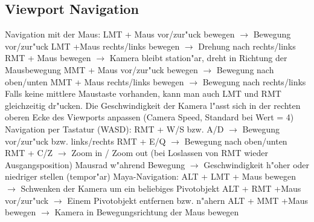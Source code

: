 \documentclass[11pt, titlepage]{article}
\begin{document}
\subsection{Viewport Navigation}

\noindent Navigation mit der Maus: \newline
\newline
\noindent LMT + Maus vor/zur"uck bewegen $\rightarrow$ Bewegung vor/zur"uck \newline
\noindent LMT +Maus rechts/links bewegen $ \rightarrow$ Drehung nach rechts/links \newline
\noindent RMT + Maus bewegen $\rightarrow$ Kamera bleibt station"ar, dreht in Richtung der Mausbewegung \newline
\noindent MMT + Maus vor/zur"uck bewegen $\rightarrow$ Bewegung nach oben/unten \newline
\noindent MMT + Maus rechts/links bewegen $ \rightarrow$ Bewegung nach rechts/links \newline
\newline
\noindent Falls keine mittlere Maustaste vorhanden, kann man auch LMT und RMT gleichzeitig dr"ucken. Die Geschwindigkeit der Kamera l"asst sich in der rechten oberen Ecke des Viewports anpassen (Camera Speed, Standard bei Wert = 4) \newline
\newline
\newline
\noindent Navigation per Tastatur (WASD): \newline
\newline
\noindent RMT + W/S bzw. A/D $\rightarrow$ Bewegung vor/zur"uck bzw. links/rechts \newline
\noindent RMT + E/Q $ \rightarrow$ Bewegung nach oben/unten \newline
\noindent RMT + C/Z $\rightarrow$ Zoom in / Zoom out (bei Loslassen von RMT wieder Ausgangsposition) \newline
\noindent Mausrad w"ahrend Bewegung $\rightarrow$ Geschwindigkeit h"oher oder niedriger stellen (tempor"ar) \newline 
\newline
\newline
\noindent Maya-Navigation: \newline
\newline
\noindent ALT + LMT + Maus bewegen $\rightarrow$ Schwenken der Kamera um ein beliebiges Pivotobjekt \newline
\noindent ALT + RMT +Maus vor/zur"uck $\rightarrow$ Einem Pivotobjekt entfernen bzw. n"ahern \newline
\noindent ALT + MMT +Maus bewegen $\rightarrow$ Kamera in Bewegungsrichtung der Maus bewegen \newline
\end{document}

